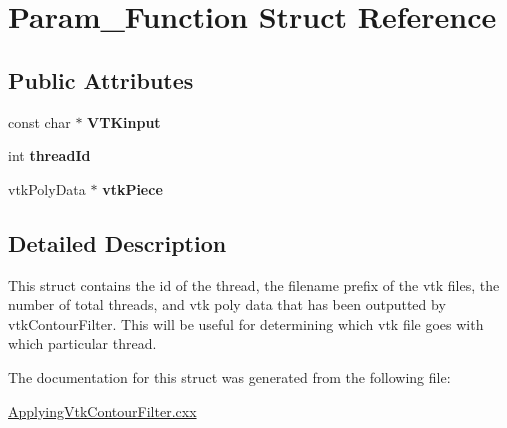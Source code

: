 \hypertarget{structParam__Function}{\section{\-Param\-\_\-\-Function \-Struct \-Reference}
\label{structParam__Function}
}
\subsection*{\-Public \-Attributes}
\begin{DoxyCompactItemize}
\item 
\hypertarget{structParam__Function_aa784ecef91feb2bd20d83d9278198f70}{const char $\ast$ {\bfseries \-V\-T\-Kinput}}\label{structParam__Function_aa784ecef91feb2bd20d83d9278198f70}

\item 
\hypertarget{structParam__Function_a22891fef7632bbca3be29572c6f4f44b}{int {\bfseries thread\-Id}}\label{structParam__Function_a22891fef7632bbca3be29572c6f4f44b}

\item 
\hypertarget{structParam__Function_a83337a785b859dc4998582842e9719e5}{vtk\-Poly\-Data $\ast$ {\bfseries vtk\-Piece}}\label{structParam__Function_a83337a785b859dc4998582842e9719e5}

\end{DoxyCompactItemize}


\subsection{\-Detailed \-Description}
\-This struct contains the id of the thread, the filename prefix of the vtk files, the number of total threads, and vtk poly data that has been outputted by vtk\-Contour\-Filter. \-This will be useful for determining which vtk file goes with which particular thread. 

\-The documentation for this struct was generated from the following file\-:\begin{DoxyCompactItemize}
\item 
\hyperlink{ApplyingVtkContourFilter_8cxx}{\-Applying\-Vtk\-Contour\-Filter.\-cxx}\end{DoxyCompactItemize}
